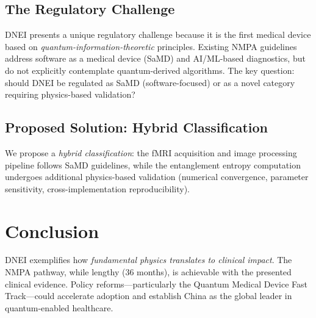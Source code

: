 \documentclass[12pt]{article}
\begin{document}
\subsection{The Regulatory Challenge}

DNEI presents a unique regulatory challenge because it is the first medical device based on \emph{quantum-information-theoretic} principles. Existing NMPA guidelines address software as a medical device (SaMD) and AI/ML-based diagnostics, but do not explicitly contemplate quantum-derived algorithms. The key question: should DNEI be regulated as SaMD (software-focused) or as a novel category requiring physics-based validation?

\subsection{Proposed Solution: Hybrid Classification}

We propose a \emph{hybrid classification}: the fMRI acquisition and image processing pipeline follows SaMD guidelines, while the entanglement entropy computation undergoes additional physics-based validation (numerical convergence, parameter sensitivity, cross-implementation reproducibility).

\section{Conclusion}
\label{sec:conclusion}

DNEI exemplifies how \emph{fundamental physics translates to clinical impact}. The NMPA pathway, while lengthy (36 months), is achievable with the presented clinical evidence. Policy reforms---particularly the Quantum Medical Device Fast Track---could accelerate adoption and establish China as the global leader in quantum-enabled healthcare.



\end{document}
